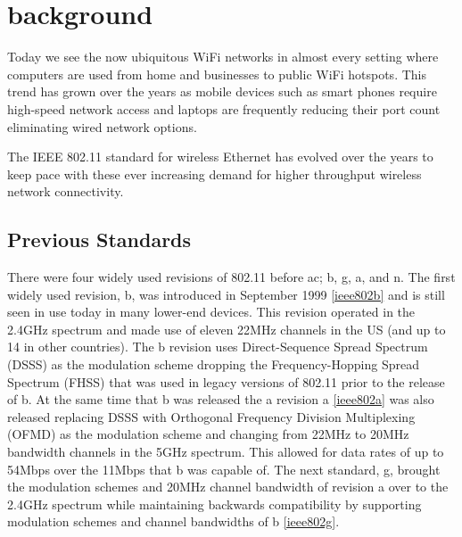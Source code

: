 \section{background}

Today we see the now ubiquitous WiFi networks in almost every setting where computers are used from home and businesses to public WiFi hotspots. This trend has grown over the years as mobile devices such as smart phones require high-speed network access and laptops are frequently reducing their port count eliminating wired network options.

The IEEE 802.11 standard for wireless Ethernet has evolved over the years to keep pace with these ever increasing demand for higher throughput wireless network connectivity.

\subsection{Previous Standards}

There were four widely used revisions of 802.11 before ac; b, g, a, and n. The first widely used revision, b, was introduced in September 1999 \ref{ieee802b} and is still seen in use today in many lower-end devices. This revision operated in the 2.4GHz spectrum and made use of eleven 22MHz channels in the US (and up to 14 in other countries). The b revision uses Direct-Sequence Spread Spectrum (DSSS) as the modulation scheme dropping the Frequency-Hopping Spread Spectrum (FHSS) that was used in legacy versions of 802.11 prior to the release of b. At the same time that b was released the a revision a \ref{ieee802a} was also released replacing DSSS with Orthogonal Frequency Division Multiplexing (OFMD) as the modulation scheme and changing from 22MHz to 20MHz bandwidth channels in the 5GHz spectrum. This allowed for data rates of up to 54Mbps over the 11Mbps that b was capable of. The next standard, g, brought the modulation schemes and 20MHz channel bandwidth of revision a over to the 2.4GHz spectrum while maintaining backwards compatibility by supporting modulation schemes and channel bandwidths of b \ref{ieee802g}.

